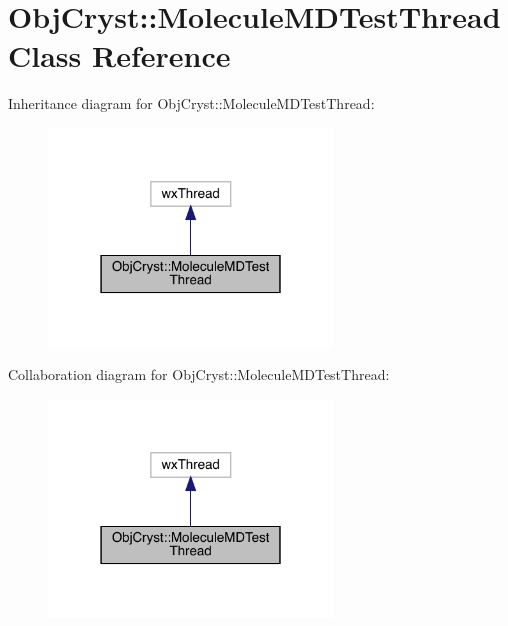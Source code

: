 \hypertarget{class_obj_cryst_1_1_molecule_m_d_test_thread}{}\section{Obj\+Cryst\+::Molecule\+M\+D\+Test\+Thread Class Reference}
\label{class_obj_cryst_1_1_molecule_m_d_test_thread}


Inheritance diagram for Obj\+Cryst\+::Molecule\+M\+D\+Test\+Thread\+:
\nopagebreak
\begin{figure}[H]
\begin{center}
\leavevmode
\includegraphics[width=214pt]{class_obj_cryst_1_1_molecule_m_d_test_thread__inherit__graph}
\end{center}
\end{figure}


Collaboration diagram for Obj\+Cryst\+::Molecule\+M\+D\+Test\+Thread\+:
\nopagebreak
\begin{figure}[H]
\begin{center}
\leavevmode
\includegraphics[width=214pt]{class_obj_cryst_1_1_molecule_m_d_test_thread__coll__graph}
\end{center}
\end{figure}

